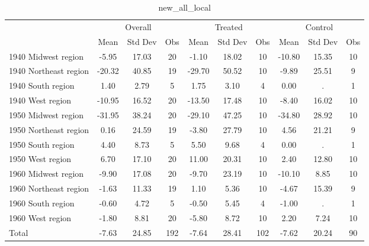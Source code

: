 \begin{table}[htbp]\centering
\def\sym#1{\ifmmode^{#1}\else\(^{#1}\)\fi}
\caption{new\_all\_local \label{tab1}}
\begin{tabular}{l*{3}{ccc}}
\toprule
                    &\multicolumn{3}{c}{Overall}           &\multicolumn{3}{c}{Treated}           &\multicolumn{3}{c}{Control}           \\
                    &        Mean&     Std Dev&         Obs&        Mean&     Std Dev&         Obs&        Mean&     Std Dev&         Obs\\
\midrule
1940 Midwest region &       -5.95&       17.03&          20&       -1.10&       18.02&          10&      -10.80&       15.35&          10\\
1940 Northeast region&      -20.32&       40.85&          19&      -29.70&       50.52&          10&       -9.89&       25.51&           9\\
1940 South region   &        1.40&        2.79&           5&        1.75&        3.10&           4&        0.00&           .&           1\\
1940 West region    &      -10.95&       16.52&          20&      -13.50&       17.48&          10&       -8.40&       16.02&          10\\
1950 Midwest region &      -31.95&       38.24&          20&      -29.10&       47.25&          10&      -34.80&       28.92&          10\\
1950 Northeast region&        0.16&       24.59&          19&       -3.80&       27.79&          10&        4.56&       21.21&           9\\
1950 South region   &        4.40&        8.73&           5&        5.50&        9.68&           4&        0.00&           .&           1\\
1950 West region    &        6.70&       17.10&          20&       11.00&       20.31&          10&        2.40&       12.80&          10\\
1960 Midwest region &       -9.90&       17.08&          20&       -9.70&       23.19&          10&      -10.10&        8.85&          10\\
1960 Northeast region&       -1.63&       11.33&          19&        1.10&        5.36&          10&       -4.67&       15.39&           9\\
1960 South region   &       -0.60&        4.72&           5&       -0.50&        5.45&           4&       -1.00&           .&           1\\
1960 West region    &       -1.80&        8.81&          20&       -5.80&        8.72&          10&        2.20&        7.24&          10\\
Total               &       -7.63&       24.85&         192&       -7.64&       28.41&         102&       -7.62&       20.24&          90\\
\bottomrule
\end{tabular}
\end{table}
